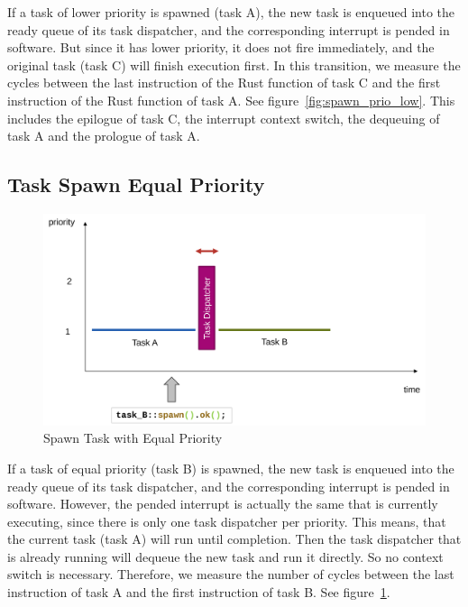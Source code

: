 If a task of lower priority is spawned (task A), the new task is enqueued into the ready queue of its task dispatcher, and the corresponding interrupt is pended in software. But since it has lower priority, it does not fire immediately, and the original task (task C) will finish execution first.
In this transition, we measure the cycles between the last instruction of the Rust function of task C and the first instruction of the Rust function of task A. See figure~\ref{fig:spawn_prio_low}.
This includes the epilogue of task C, the interrupt context switch, the dequeuing of task A and the prologue of task A.

\subsection{Task Spawn Equal Priority}

\begin{figure}
  \centerfloat
  \includegraphics[width=\textwidth]{fig/spawn_prio_equal.svg.pdf}
  \caption{Spawn Task with Equal Priority}%
  \label{fig:spawn_prio_equal}
\end{figure}

If a task of equal priority (task B) is spawned, the new task is enqueued into the ready queue of its task dispatcher, and the corresponding interrupt is pended in software. However, the pended interrupt is actually the same that is currently executing, since there is only one task dispatcher per priority. This means, that the current task (task A) will run until completion. Then the task dispatcher that is already running will dequeue the new task and run it directly. So no context switch is necessary. Therefore, we measure the number of cycles between the last instruction of task A and the first instruction of task B. See figure~\ref{fig:spawn_prio_equal}.

